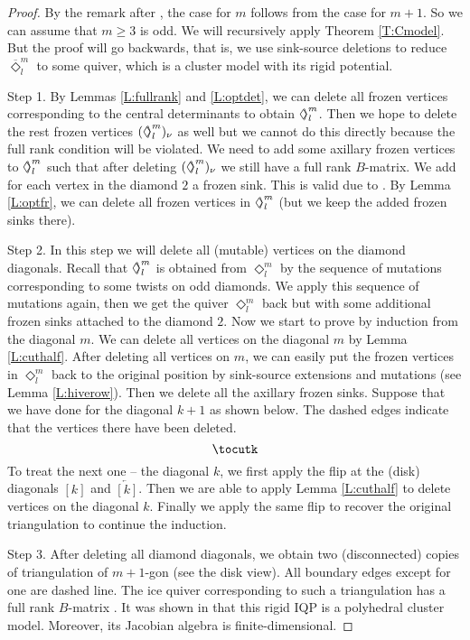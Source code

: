 \documentclass{amsart}
\theoremstyle{definition}
\theoremstyle{remark}
\numberwithin{equation}{section}
\newcommand{\br}[1]{\overline{#1}}
\newcommand{\Diamondsh}{\mathrel{\Diamond\!\!\raisebox{0.45pt}{$\rangle$}}}
\begin{document}
\begin{proof} By the remark after \cite[Theorem 3.17]{Fs2}, the case for $m$ follows from the case for $m+1$. 
	So we can assume that $m\geq 3$ is odd. 
	We will recursively apply Theorem \ref{T:Cmodel}.
	But the proof will go backwards, that is, we use sink-source deletions to reduce $\br{\Diamond}_l^m$ to some quiver, which is a cluster model with its rigid potential. 
	
	Step 1. By Lemmas \ref{L:fullrank} and \ref{L:optdet}, we can delete all frozen vertices corresponding to the central determinants to obtain $\Diamondsh_l^m$. 
	Then we hope to delete the rest frozen vertices $(\Diamondsh_l^m)_\nu$ as well but we cannot do this directly because the full rank condition will be violated. We need to add some axillary frozen vertices to $\Diamondsh_l^m$ such that after deleting $(\Diamondsh_l^m)_\nu$ we still have a full rank $B$-matrix. We add for each vertex in the diamond $2$ a frozen sink. This is valid due to \cite[Lemma 2.5]{FW}.
	By Lemma \ref{L:optfr}, we can delete all frozen vertices in $\Diamondsh_l^m$ (but we keep the added frozen sinks there).
	
	Step 2. In this step we will delete all (mutable) vertices on the diamond diagonals.
	Recall that $\Diamondsh_l^m$ is obtained from $\Diamond_l^m$ by the sequence of mutations corresponding to some twists on odd diamonds.
	We apply this sequence of mutations again, then
	we get the quiver $\Diamond_l^m$ back but with some additional frozen sinks attached to the diamond $2$.
	Now we start to prove by induction from the diagonal $m$. We can delete all vertices on the diagonal $m$ by Lemma \ref{L:cuthalf}.
	After deleting all vertices on $m$, we can easily put the frozen vertices in $\Diamond_l^m$ back to the original position by sink-source extensions and mutations (see Lemma \ref{L:hiverow}).
	Then we delete all the axillary frozen sinks. %
	Suppose that we have done for the diagonal $k+1$ as shown below. 
	The dashed edges indicate that the vertices there have been deleted. 
	$$\tocutk$$
	To treat the next one -- the diagonal $k$, we first apply the flip at the (disk) diagonals $[k]$ and $\overleftarrow{[k]}$. 
	Then we are able to apply Lemma \ref{L:cuthalf} to delete vertices on the diagonal $k$.
	Finally we apply the same flip to recover the original triangulation to continue the induction.
	
	
	Step 3. After deleting all diamond diagonals, we obtain two (disconnected) copies of triangulation of $m+1$-gon (see the disk view). 
	All boundary edges except for one are dashed line. The ice quiver corresponding to such a triangulation has a full rank $B$-matrix \cite{FW}.
	It was shown in \cite[Proposition 3.4]{FW} that this rigid IQP is a polyhedral cluster model.   
	Moreover, its Jacobian algebra is finite-dimensional.
\end{proof}
  
\end{document}
